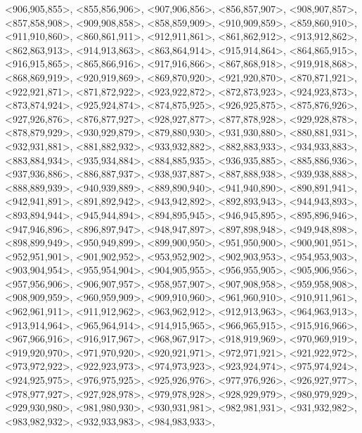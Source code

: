 \documentclass[a4paper,10pt]{article}
\begin{document}
\begin{eulernotebook}
\begin{euleroutput}
  <906,905,855>,
  <855,856,906>,
  <907,906,856>,
  <856,857,907>,
  <908,907,857>,
  <857,858,908>,
  <909,908,858>,
  <858,859,909>,
  <910,909,859>,
  <859,860,910>,
  <911,910,860>,
  <860,861,911>,
  <912,911,861>,
  <861,862,912>,
  <913,912,862>,
  <862,863,913>,
  <914,913,863>,
  <863,864,914>,
  <915,914,864>,
  <864,865,915>,
  <916,915,865>,
  <865,866,916>,
  <917,916,866>,
  <867,868,918>,
  <919,918,868>,
  <868,869,919>,
  <920,919,869>,
  <869,870,920>,
  <921,920,870>,
  <870,871,921>,
  <922,921,871>,
  <871,872,922>,
  <923,922,872>,
  <872,873,923>,
  <924,923,873>,
  <873,874,924>,
  <925,924,874>,
  <874,875,925>,
  <926,925,875>,
  <875,876,926>,
  <927,926,876>,
  <876,877,927>,
  <928,927,877>,
  <877,878,928>,
  <929,928,878>,
  <878,879,929>,
  <930,929,879>,
  <879,880,930>,
  <931,930,880>,
  <880,881,931>,
  <932,931,881>,
  <881,882,932>,
  <933,932,882>,
  <882,883,933>,
  <934,933,883>,
  <883,884,934>,
  <935,934,884>,
  <884,885,935>,
  <936,935,885>,
  <885,886,936>,
  <937,936,886>,
  <886,887,937>,
  <938,937,887>,
  <887,888,938>,
  <939,938,888>,
  <888,889,939>,
  <940,939,889>,
  <889,890,940>,
  <941,940,890>,
  <890,891,941>,
  <942,941,891>,
  <891,892,942>,
  <943,942,892>,
  <892,893,943>,
  <944,943,893>,
  <893,894,944>,
  <945,944,894>,
  <894,895,945>,
  <946,945,895>,
  <895,896,946>,
  <947,946,896>,
  <896,897,947>,
  <948,947,897>,
  <897,898,948>,
  <949,948,898>,
  <898,899,949>,
  <950,949,899>,
  <899,900,950>,
  <951,950,900>,
  <900,901,951>,
  <952,951,901>,
  <901,902,952>,
  <953,952,902>,
  <902,903,953>,
  <954,953,903>,
  <903,904,954>,
  <955,954,904>,
  <904,905,955>,
  <956,955,905>,
  <905,906,956>,
  <957,956,906>,
  <906,907,957>,
  <958,957,907>,
  <907,908,958>,
  <959,958,908>,
  <908,909,959>,
  <960,959,909>,
  <909,910,960>,
  <961,960,910>,
  <910,911,961>,
  <962,961,911>,
  <911,912,962>,
  <963,962,912>,
  <912,913,963>,
  <964,963,913>,
  <913,914,964>,
  <965,964,914>,
  <914,915,965>,
  <966,965,915>,
  <915,916,966>,
  <967,966,916>,
  <916,917,967>,
  <968,967,917>,
  <918,919,969>,
  <970,969,919>,
  <919,920,970>,
  <971,970,920>,
  <920,921,971>,
  <972,971,921>,
  <921,922,972>,
  <973,972,922>,
  <922,923,973>,
  <974,973,923>,
  <923,924,974>,
  <975,974,924>,
  <924,925,975>,
  <976,975,925>,
  <925,926,976>,
  <977,976,926>,
  <926,927,977>,
  <978,977,927>,
  <927,928,978>,
  <979,978,928>,
  <928,929,979>,
  <980,979,929>,
  <929,930,980>,
  <981,980,930>,
  <930,931,981>,
  <982,981,931>,
  <931,932,982>,
  <983,982,932>,
  <932,933,983>,
  <984,983,933>,

\end{euleroutput}
\end{eulernotebook}
\end{document}
